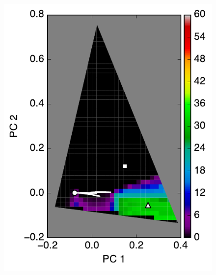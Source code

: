 \documentclass[iop,numberedappendix,apj,]{emulateapj}
\begin{document}
\begin{figure}[tbh!]
\begin{minipage}{0.33\hsize}
\begin{center}
	\includegraphics[width=\hsize]{mockdata_90deg_3types_t360_lc_noreg_1.pdf}
    \end{center}	
   \end{minipage}
   \begin{minipage}{0.33\hsize}
    \begin{center}

\end{center}
\end{minipage}
\end{figure}
\end{document}

